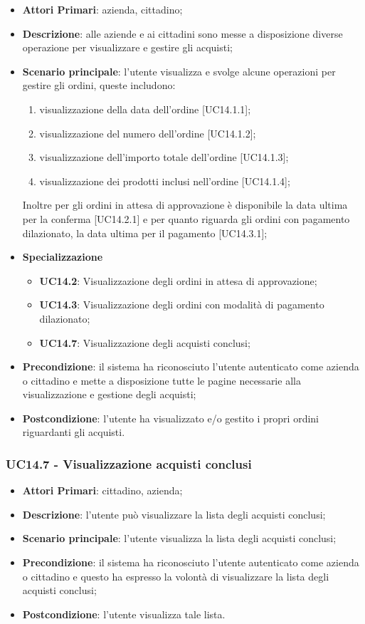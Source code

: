\begin{itemize}
	\item \textbf{Attori Primari}: azienda, cittadino;
	\item \textbf{Descrizione}: alle aziende e ai cittadini sono messe a disposizione diverse operazione per visualizzare e gestire gli acquisti;
	\item \textbf{Scenario principale}: l'utente visualizza e svolge alcune operazioni per gestire gli ordini, queste includono:
		\begin{enumerate}[label=\alph*.]
		\item visualizzazione della data dell'ordine [UC14.1.1];
		\item visualizzazione del numero dell'ordine [UC14.1.2];
		\item visualizzazione dell'importo totale dell'ordine [UC14.1.3];
		\item visualizzazione dei prodotti inclusi nell'ordine [UC14.1.4];
	\end{enumerate}
	Inoltre per gli ordini in attesa di approvazione è disponibile la data ultima per la conferma [UC14.2.1] e per quanto riguarda gli ordini con pagamento dilazionato,  la data ultima per il pagamento [UC14.3.1];
	\item \textbf{Specializzazione}
	\begin{itemize}
		\item \textbf{UC14.2}: Visualizzazione degli ordini in attesa di approvazione;
		\item \textbf{UC14.3}: Visualizzazione degli ordini con modalità di pagamento dilazionato;
		\item \textbf{UC14.7}: Visualizzazione degli acquisti conclusi;
	\end{itemize}
	\item \textbf{Precondizione}: il sistema ha riconosciuto l'utente autenticato come azienda o cittadino e mette a disposizione tutte le pagine necessarie alla visualizzazione e gestione degli acquisti;
	\item \textbf{Postcondizione}: l'utente ha visualizzato e/o gestito i propri ordini riguardanti gli acquisti.
\end{itemize} 
\subsubsection{UC14.7 - Visualizzazione acquisti conclusi}
\begin{itemize}
	\item \textbf{Attori Primari}: cittadino, azienda;
	\item \textbf{Descrizione}: l'utente può visualizzare la lista degli acquisti conclusi;
	\item \textbf{Scenario principale}: l'utente visualizza la lista degli acquisti conclusi;
	\item \textbf{Precondizione}: il sistema ha riconosciuto l'utente autenticato come azienda o cittadino e questo ha espresso la volontà di visualizzare la lista degli acquisti conclusi;
	\item \textbf{Postcondizione}: l'utente visualizza tale lista.
\end{itemize}
